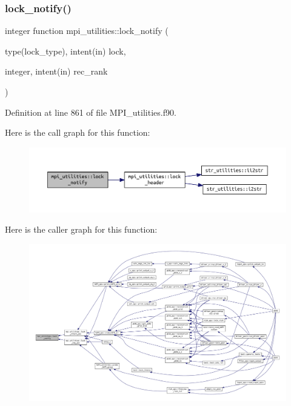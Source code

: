 \subsubsection{\texorpdfstring{lock\+\_\+notify()}{lock\_notify()}}
{\footnotesize\ttfamily integer function mpi\+\_\+utilities\+::lock\+\_\+notify (\begin{DoxyParamCaption}\item[{type(lock\+\_\+type), intent(in)}]{lock,  }\item[{integer, intent(in)}]{rec\+\_\+rank }\end{DoxyParamCaption})}



Definition at line 861 of file M\+P\+I\+\_\+utilities.\+f90.

Here is the call graph for this function\+:
\nopagebreak
\begin{figure}[H]
\begin{center}
\leavevmode
\includegraphics[width=350pt]{namespacempi__utilities_a5d2dbf8ffba124237c362f06c3d3ac32_cgraph}
\end{center}
\end{figure}
Here is the caller graph for this function\+:
\nopagebreak
\begin{figure}[H]
\begin{center}
\leavevmode
\includegraphics[width=350pt]{namespacempi__utilities_a5d2dbf8ffba124237c362f06c3d3ac32_icgraph}
\end{center}
\end{figure}
\mbox{\label{namespacempi__utilities_a5a789d05be41d6109c01f46cc98620c8}} 
